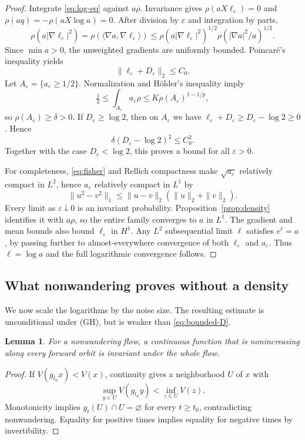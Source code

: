 \documentclass[11pt]{article}
\newtheorem{lemma}[theorem]{Lemma}
\theoremstyle{definition}
\theoremstyle{remark}
\newcommand{\eps}{\varepsilon}
\begin{document}
\begin{proof}
Integrate \eqref{eq:log-eq} against $a\rho$. Invariance gives $\rho(aX\ell_\eps)=0$ and $\rho(aq)=-\rho(aX\log a)=0$. After division by $\eps$ and integration by parts,
\[
 \rho(a|\nabla\ell_\eps|^2)=\rho(\langle\nabla a,\nabla\ell_\eps\rangle)
 \le\rho(a|\nabla\ell_\eps|^2)^{1/2}
       \rho(|\nabla a|^2/a)^{1/2}.
\]
Since $\min a>0$, the unweighted gradients are uniformly bounded. Poincar\'e's inequality yields
\[
 \|\ell_\eps+D_\eps\|_2\le C_0.
\]
Let $A_\eps=\{a_\eps\ge1/2\}$. Normalization and H\"older's inequality imply
\[
 \tfrac12\le\int_{A_\eps}a_\eps\rho
 \le K\rho(A_\eps)^{1-1/p},
\]
so $\rho(A_\eps)\ge\delta>0$. If $D_\eps\ge\log2$, then on $A_\eps$ we have $\ell_\eps+D_\eps\ge D_\eps-\log2\ge0$. Hence
\[
 \delta(D_\eps-\log2)^2\le C_0^2.
\]
Together with the case $D_\eps<\log2$, this proves a bound for all $\eps>0$.

For completeness, \eqref{eq:fisher} and Rellich compactness make $\sqrt{a_\eps}$ relatively compact in $L^2$, hence $a_\eps$ relatively compact in $L^1$ by
\[
 \|u^2-v^2\|_1\le\|u-v\|_2(\|u\|_2+\|v\|_2).
\]
Every limit as $\eps\downarrow0$ is an invariant probability. Proposition~\ref{prop:density} identifies it with $a\rho$, so the entire family converges to $a$ in $L^1$. The gradient and mean bounds also bound $\ell_\eps$ in $H^1$. Any $L^2$ subsequential limit $\ell$ satisfies $e^\ell=a$, by passing further to almost-everywhere convergence of both $\ell_\eps$ and $a_\eps$. Thus $\ell=\log a$ and the full logarithmic convergence follows.
\end{proof}

\subsection{What nonwandering proves without a density}

We now scale the logarithms by the noise size. The resulting estimate is unconditional under (GH), but is weaker than \eqref{eq:bounded-D}.

\begin{lemma}\label{lem:Lyapunov}
For a nonwandering flow, a continuous function that is nonincreasing along every forward orbit is invariant under the whole flow.
\end{lemma}
\begin{proof}
If $V(g_{t_0}x)<V(x)$, continuity gives a neighborhood $U$ of $x$ with
\[
 \sup_{y\in U}V(g_{t_0}y)<\inf_{z\in U}V(z).
\]
Monotonicity implies $g_t(U)\cap U=\varnothing$ for every $t\ge t_0$, contradicting nonwandering. Equality for positive times implies equality for negative times by invertibility.
\end{proof}
\end{document}
